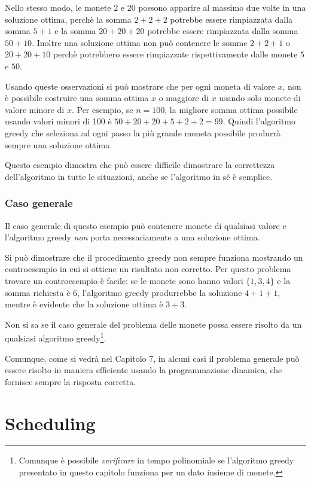 Nello stesso modo, le monete 2 e 20 possono apparire al massimo due 
volte in una soluzione ottima, perchè la somma $2+2+2$ potrebbe essere
rimpiazzata dalla somma $5+1$ e la somma $20+20+20$ potrebbe essere rimpiazzata
dalla somma $50+10$.
Inoltre una soluzione ottima non può contenere le somme
$2+2+1$ o $20+20+10$ perchè potrebbero essere 
rimpiazzate rispettivamente dalle
monete $5$ e $50$.

Usando queste osservazioni 
si può mostrare che per ogni moneta di valore $x$,
non è possibile costruire una somma ottima $x$ o maggiore di $x$
usando solo monete di valore minore di $x$.
Per esempio, se $n=100$, la migliore somma ottima possibile
usando valori minori di 100 è $50+20+20+5+2+2=99$.
Quindi l'algoritmo greedy che seleziona ad ogni passo la più
grande moneta possibile produrrà sempre una soluzione ottima.

Questo esempio dimostra che può essere difficile
dimostrare la correttezza dell'algoritmo in tutte le situazioni,
anche se l'algoritmo in sé è semplice. 

\subsubsection{Caso generale}
Il caso generale di questo esempio può contenere monete
di qualsiasi valore e l'algoritmo greedy \emph{non} porta necessariamente
a una soluzione ottima.

Si può dimostrare che il procedimento greedy non sempre
funziona mostrando un controesempio in cui si ottiene un risultato non corretto.
Per questo problema trovare un controesempio è facile:
se le monete sono hanno valori $\{1,3,4\}$ e la somma richiesta è 6,
l'algoritmo greedy produrrebbe la soluzione 
$4+1+1$, mentre è evidente che la soluzione ottima è $3+3$.

Non si sa se il caso generale del problema delle monete
possa essere risolto da un qualsiasi algoritmo greedy\footnote{Comunque è possibile
\emph{verificare} in tempo polinomiale
se l'algoritmo greedy presentato in questo capitolo
funziona per un dato insieme di monete\cite{pea05}.}.

Comunque, come si vedrà nel Capitolo 7,
in alcuni casi il problema generale può essere risolto
in maniera efficiente usando la programmazione dinamica,
che fornisce sempre la risposta corretta.

\section{Scheduling}

